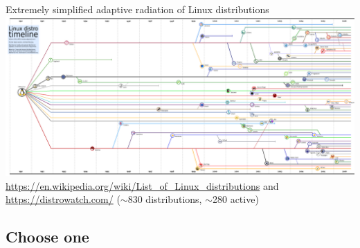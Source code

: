 \documentclass[compress, ucs, xelatex, 11pt, xcolor=svgnames,
  hyperref={
    bookmarks=true,
    unicode=true,
    colorlinks=true,
    pdftitle={Linux, command line and MetaCentrum},
    plainpages=false,
    pdfauthor={Vojtech Zeisek},
    pdfsubject={Course about use of Linux command line, writing shell scripts and using MetaCentrum of CESNET},
    pdfcreator={XeLaTeX},
    pdfkeywords={Linux, GNU, BASH, shell, command line, MetaCentrum},
    linkcolor=DarkRed,
    anchorcolor=DarkBlue,
    citecolor=Indigo,
    filecolor=NavyBlue,
    menucolor=DarkMagenta,
    urlcolor=DarkBlue,
    pdftex},
  url={hyphens, lowtilde} %
  ]{beamer}
\begin{document}
\begin{frame}{Extremely simplified adaptive radiation of Linux distributions}
  \includegraphics[width=\textwidth]{linux_fylogen_2.png}
  \vfil
  \url{https://en.wikipedia.org/wiki/List_of_Linux_distributions} and \url{https://distrowatch.com/} ($\sim$830 distributions, $\sim$280 active)
  \vfill
\end{frame}

\subsection{Choose one}
\end{document}

